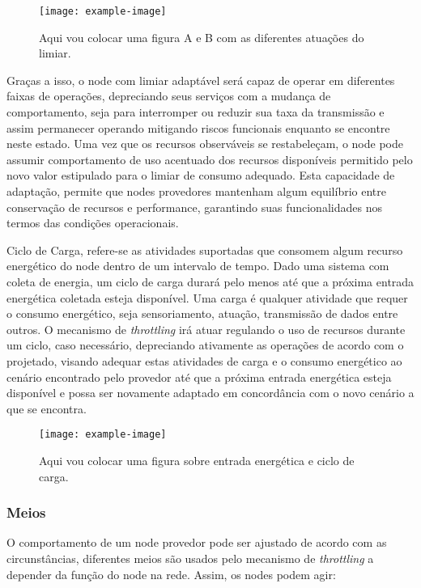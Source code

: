 \begin{itemize}
    \begin{figure}[h]
    	\centering
    	\texttt{[image: example-image]} 
    	\caption{Aqui vou colocar uma figura A e B com as diferentes atuações do limiar.}
    \end{figure}
    
    Graças a isso, o node com limiar adaptável será capaz de operar em diferentes faixas de operações, depreciando seus serviços com a mudança de comportamento, seja para interromper ou reduzir sua taxa da transmissão e assim permanecer operando mitigando riscos funcionais enquanto se encontre neste estado. Uma vez que os recursos observáveis se restabeleçam, o node pode assumir comportamento de uso acentuado dos recursos disponíveis permitido pelo novo valor estipulado para o limiar de consumo adequado. Esta capacidade de adaptação, permite que nodes provedores mantenham algum equilíbrio entre conservação de recursos e performance, garantindo suas funcionalidades nos termos das condições operacionais.
    
      
 
    
\end{itemize}


Ciclo de Carga, refere-se as atividades suportadas que consomem algum recurso energético do node dentro de um intervalo de tempo. Dado uma sistema com coleta de energia, um ciclo de carga durará pelo menos até que a próxima entrada energética coletada esteja disponível.  Uma carga é qualquer atividade que requer o consumo energético, seja sensoriamento, atuação, transmissão de dados entre outros. O mecanismo de \textit{throttling} irá atuar regulando o uso de recursos durante um ciclo, caso necessário, depreciando ativamente as operações de acordo com o projetado, visando adequar estas atividades de carga e o consumo energético ao cenário encontrado pelo provedor até que a próxima entrada energética esteja disponível e possa ser novamente adaptado em concordância com o novo cenário a que se encontra.

   \begin{figure}[h]
	\centering
	\noindent\texttt{[image: example-image]} 
	\caption{Aqui vou colocar uma figura sobre entrada energética e ciclo de carga.}
\end{figure}


\subsubsection{Meios}
O comportamento de um node provedor pode ser ajustado de acordo com as circunstâncias, diferentes meios são usados pelo mecanismo de \textit{throttling} a depender da função do node na rede. Assim, os nodes podem agir: 

